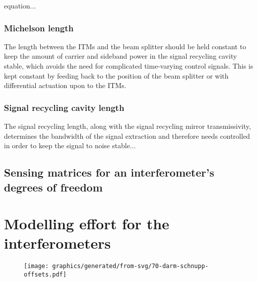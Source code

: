 equation...

\subsubsection{Michelson length}
The length between the \glspl{ITM} and the beam splitter should be held constant to keep the amount of carrier and sideband power in the signal recycling cavity stable, which avoids the need for complicated time-varying control signals. This is kept constant by feeding back to the position of the beam splitter or with differential actuation upon to the \glspl{ITM}.


\subsubsection{Signal recycling cavity length}
The signal recycling length, along with the signal recycling mirror transmissivity, determines the bandwidth of the signal extraction and therefore needs controlled in order to keep the signal to noise stable...

\subsection{Sensing matrices for an interferometer's degrees of freedom}

\section{Modelling effort for the \ET{} interferometers}

\begin{figure}
  \centering
  \texttt{[image: graphics/generated/from-svg/70-darm-schnupp-offsets.pdf]}
  \caption[Differential arm and Schnupp offsets in a \DRFPMI{}]{\label{fig:darm-schnupp-offsets}}
\end{figure}

